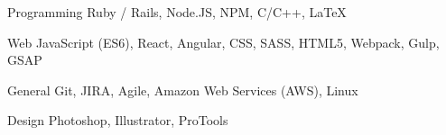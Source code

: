 

\begin{cvskills}

  \cvskill
    {Programming} %
    {Ruby / Rails, Node.JS, NPM, C/C++, LaTeX} %

  \cvskill
    {Web} %
    {JavaScript (ES6), React, Angular, CSS, SASS, HTML5, Webpack, Gulp, GSAP} %

  \cvskill
    {General} %
    {Git, JIRA, Agile, Amazon Web Services (AWS), Linux} %

  \cvskill
    {Design} %
    {Photoshop, Illustrator, ProTools} %

\end{cvskills}
